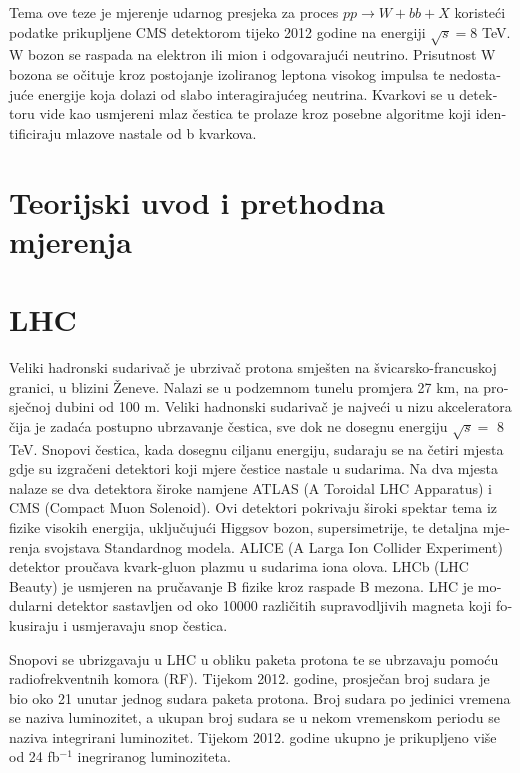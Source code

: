 \begin{otherlanguage}{croatian}
Tema ove teze je mjerenje udarnog presjeka za proces $pp\rightarrow W+bb+X$ koristeći podatke prikupljene CMS detektorom tijeko 2012 godine na energiji $\sqrt{s} = 8$ TeV. W bozon se raspada na elektron ili mion i odgovarajući neutrino. Prisutnost W bozona se očituje kroz postojanje izoliranog leptona visokog impulsa te nedostajuće energije koja dolazi od slabo interagirajućeg neutrina. Kvarkovi se u detektoru vide kao usmjereni mlaz čestica te prolaze kroz posebne algoritme koji identificiraju mlazove nastale od b kvarkova.

\section{Teorijski uvod i prethodna mjerenja}




\section{LHC}
Veliki hadronski sudarivač je ubrzivač protona smješten na švicarsko-francuskoj granici, u blizini Ženeve. Nalazi se u podzemnom tunelu promjera 27 km, na prosječnoj dubini od 100 m. Veliki hadnonski sudarivač je najveći u nizu akceleratora čija je zadaća postupno ubrzavanje čestica, sve dok ne dosegnu energiju $\sqrt{s}=$ 8 TeV. Snopovi čestica, kada dosegnu ciljanu energiju, sudaraju se na četiri mjesta gdje su izgračeni detektori koji mjere čestice nastale u sudarima. Na dva mjesta nalaze se dva detektora široke namjene ATLAS (A Toroidal LHC Apparatus) i CMS (Compact Muon Solenoid).  Ovi detektori pokrivaju široki spektar tema iz fizike visokih energija, uključujući Higgsov bozon, supersimetrije, te detaljna mjerenja svojstava Standardnog modela. ALICE (A Larga Ion Collider Experiment) detektor proučava kvark-gluon plazmu u sudarima iona olova. LHCb (LHC Beauty) je usmjeren na pručavanje B fizike kroz raspade B mezona. LHC je modularni detektor sastavljen od oko 10000 različitih supravodljivih magneta koji fokusiraju i usmjeravaju snop čestica.
\par Snopovi se ubrizgavaju u LHC u obliku paketa protona te se ubrzavaju pomoću radiofrekventnih komora (RF). Tijekom 2012. godine, prosječan broj sudara je bio oko 21 unutar jednog sudara paketa protona. Broj sudara po jedinici vremena se naziva luminozitet, a ukupan broj sudara se u nekom vremenskom periodu se naziva integrirani luminozitet. Tijekom 2012. godine ukupno je prikupljeno više od 24 fb$^{-1}$ inegriranog luminoziteta. 


\end{otherlanguage}
